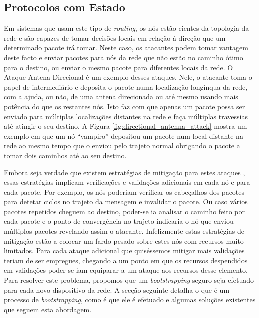 \documentclass{llncs}
\begin{document}
\subsection{Protocolos com Estado}
\label{sec:tables_routing}
Em sistemas que usam este tipo de \textit{routing}, os nós estão cientes da topologia da rede e são capazes de tomar decisões locais em relação à direção que um determinado pacote irá tomar. Neste caso, os atacantes podem tomar vantagem deste facto e enviar pacotes para nós da rede que não estão no caminho ótimo para o destino, ou enviar o mesmo pacote para diferentes locais da rede. O Ataque Antena Direcional é um exemplo desses ataques. Nele, o atacante toma o papel de intermediário e deposita o pacote numa localização longínqua da rede, com a ajuda, ou não, de uma antena direcionada ou até mesmo usando mais potência do que os restantes nós. Isto faz com que apenas um pacote possa ser enviado para múltiplas localizações distantes na rede e faça múltiplas travessias até atingir o seu destino. A Figura \ref{fig:directional_antenna_attack} mostra um exemplo em que um nó ``vampiro'' depositou um pacote num local distante na rede ao mesmo tempo que o enviou pelo trajeto normal obrigando o pacote a tomar dois caminhos até ao seu destino.

Embora seja verdade que existem estratégias de mitigação para estes ataques \cite{Vasserman2013}, essas estratégias implicam verificações e validações adicionais em cada nó e para cada pacote. Por exemplo, os nós poderiam verificar os cabeçalhos dos pacotes para detetar ciclos no trajeto da mensagem e invalidar o pacote. Ou caso vários pacotes repetidos cheguem ao destino, poder-se ia analisar o caminho feito por cada pacote e o ponto de convergência no trajeto indicaria o nó que enviou múltiplos pacotes revelando assim o atacante. Infelizmente estas estratégias de mitigação estão a colocar um fardo pesado sobre estes nós com recursos muito limitados. Para cada ataque adicional que quiséssemos mitigar mais validações teriam de ser empregues, chegando a um ponto em que os recursos despendidos em validações poder-se-iam equiparar a um ataque aos recursos desse elemento. Para resolver este problema, propomos que um \textit{bootstrapping} seguro seja efetuado para cada novo dispositivo da rede. A secção seguinte detalha o que é um processo de \textit{bootstrapping}, como é que ele é efetuado e algumas soluções existentes que seguem esta abordagem.
\end{document}
